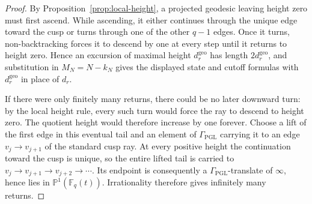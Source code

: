 \documentclass[11pt]{amsart}
\theoremstyle{definition}
\theoremstyle{plain}
\newcommand{\Fq}{\mathbb F_q}
\newcommand{\GammaP}{\Gamma_{\mathrm{PGL}}}
\begin{document}
\begin{proof}
By Proposition~\ref{prop:local-height}, a projected geodesic leaving height zero
must first ascend.  While ascending, it either continues through the unique
edge toward the cusp or turns through one of the other \(q-1\) edges.  Once it
turns, non-backtracking forces it to descend by one at every step until it
returns to height zero.  Hence an excursion of maximal height
\(d_r^{\mathrm{geo}}\) has length \(2d_r^{\mathrm{geo}}\), and substitution in
\(M_N=N-k_N\) gives the displayed state and cutoff formulas with
\(d_r^{\mathrm{geo}}\) in place of \(d_r\).

If there were only finitely many returns, there could be no later downward
turn: by the local height rule, every such turn would force the ray to descend
to height zero.  The quotient height would therefore increase by one forever.
Choose a lift of the first edge in this eventual tail and an element of
\(\GammaP\) carrying it to an edge \(v_j\to v_{j+1}\) of the standard cusp
ray.  At every positive height the continuation toward the cusp is unique, so
the entire lifted tail is carried to
\(v_j\to v_{j+1}\to v_{j+2}\to\cdots\).  Its endpoint is consequently a
\(\GammaP\)-translate of \(\infty\), hence lies in
\(\mathbb P^1(\Fq(t))\).  Irrationality therefore gives infinitely many
returns.


\end{proof}
\end{document}
